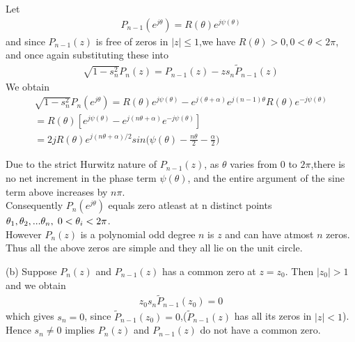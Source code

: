 \documentclass{beamer}
\begin{document}
\begin{frame}
Let 
\begin{align}
    P_{n-1}(e^{j\theta})=R(\theta)e^{j\psi(\theta)}
\end{align}
and since $P_{n-1}(z)$ is free of zeros in $|z|\leq 1$,we have $R(\theta)>0,0<\theta<2\pi$, and once again substituting these into 
\begin{align}
    \sqrt{1-s_n^2}P_n(z)=P_{n-1}(z)-z s_n\tilde{P}_{n-1}(z)
\end{align}
We obtain
\begin{align}
     \sqrt{1-s_n^2}P_n(e^{j\theta})= R(\theta)e^{j\psi(\theta)} - e^{j(\theta+\alpha)}e^{j(n-1)\theta}R(\theta)e^{-j\psi(\theta)}\\
     =R(\theta)[e^{j\psi(\theta)}-e^{j(n\theta+\alpha)}e^{-j\psi(\theta)}]\\
     =2jR(\theta)e^{j(n\theta+\alpha)/2} sin\bigg(\psi(\theta)-\frac{n\theta}{2}-\frac{\alpha}{2} \bigg)
\end{align}
\end{frame}
\begin{frame}
Due to the strict Hurwitz nature of $P_{n-1}(z)$, as $\theta$ varies from $0$ to $2\pi$,there is no net increment in the phase term $\psi(\theta)$, and the entire argument of the sine term above increases by $n\pi$.\\
Consequently $P_n(e^{j\theta})$ equals zero atleast at n distinct points $\theta_1,\theta_2,...\theta_n,\hspace{1mm} 0<\theta_i<2\pi$.\\
However $P_n(z)$ is a polynomial odd degree $n$ is $z$ and can have atmost $n$ zeros. Thus all the above zeros are simple and they all lie on the unit circle. 
    
\end{frame}
\begin{frame}
(b)  Suppose $P_n(z)$ and $P_{n-1}(z)$ has a common zero at $z=z_0$. Then $|z_0|>1$ and we obtain
    \begin{align}
        z_0s_n\tilde{P}_{n-1}(z_0)=0
    \end{align}
which gives $s_n=0$, since $\tilde{P}_{n-1}(z_0)=0$,($\tilde{P}_{n-1}(z)$ has all its zeros in $|z|<1$).\\
Hence $s_n\neq0$ implies $P_n(z)$ and $P_{n-1}(z)$ do not have a common zero.
\end{frame}
\end{document}
